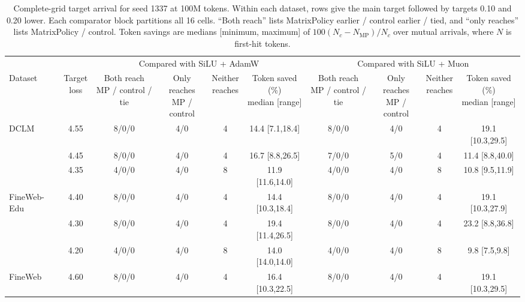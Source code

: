 \begin{table}[!t]
\centering
\caption{Complete-grid target arrival for seed 1337 at 100M tokens. Within each dataset, rows give the main target followed by targets 0.10 and 0.20 lower. Each comparator block partitions all 16 cells. ``Both reach'' lists MatrixPolicy earlier / control earlier / tied, and ``only reaches'' lists MatrixPolicy / control. Token savings are medians [minimum, maximum] of $100(N_c-N_{\mathrm{MP}})/N_c$ over mutual arrivals, where $N$ is first-hit tokens.}
\label{tab:e8-sensitivity-target-arrival}
\begingroup
\scriptsize
\setlength{\tabcolsep}{1.9pt}
\renewcommand{\arraystretch}{1.05}
\begin{tabular*}{\textwidth}{@{\extracolsep{\fill}}lccccc@{\hspace{0.45em}}cccc@{}}
\toprule
& & \multicolumn{4}{c}{Compared with SiLU + AdamW} & \multicolumn{4}{c}{Compared with SiLU + Muon} \\
\cmidrule(lr){3-6}\cmidrule(lr){7-10}
Dataset & \shortstack{Target\\loss} & \shortstack{Both reach\\MP / control / tie} & \shortstack{Only reaches\\MP / control} & \shortstack{Neither\\reaches} & \shortstack{Token saved (\%)\\median [range]} & \shortstack{Both reach\\MP / control / tie} & \shortstack{Only reaches\\MP / control} & \shortstack{Neither\\reaches} & \shortstack{Token saved (\%)\\median [range]} \\
\midrule
DCLM & 4.55 & 8/0/0 & 4/0 & 4 & 14.4 [7.1,18.4] & 8/0/0 & 4/0 & 4 & 19.1 [10.3,29.5] \\
 & 4.45 & 8/0/0 & 4/0 & 4 & 16.7 [8.8,26.5] & 7/0/0 & 5/0 & 4 & 11.4 [8.8,40.0] \\
 & 4.35 & 4/0/0 & 4/0 & 8 & 11.9 [11.6,14.0] & 4/0/0 & 4/0 & 8 & 10.8 [9.5,11.9] \\
\addlinespace[2pt]
FineWeb-Edu & 4.40 & 8/0/0 & 4/0 & 4 & 14.4 [10.3,18.4] & 8/0/0 & 4/0 & 4 & 19.1 [10.3,27.9] \\
 & 4.30 & 8/0/0 & 4/0 & 4 & 19.4 [11.4,26.5] & 8/0/0 & 4/0 & 4 & 23.2 [8.8,36.8] \\
 & 4.20 & 4/0/0 & 4/0 & 8 & 14.0 [14.0,14.0] & 4/0/0 & 4/0 & 8 & 9.8 [7.5,9.8] \\
\addlinespace[2pt]
FineWeb & 4.60 & 8/0/0 & 4/0 & 4 & 16.4 [10.3,22.5] & 8/0/0 & 4/0 & 4 & 19.1 [10.3,29.5] \\

\end{tabular*}
\end{table}
